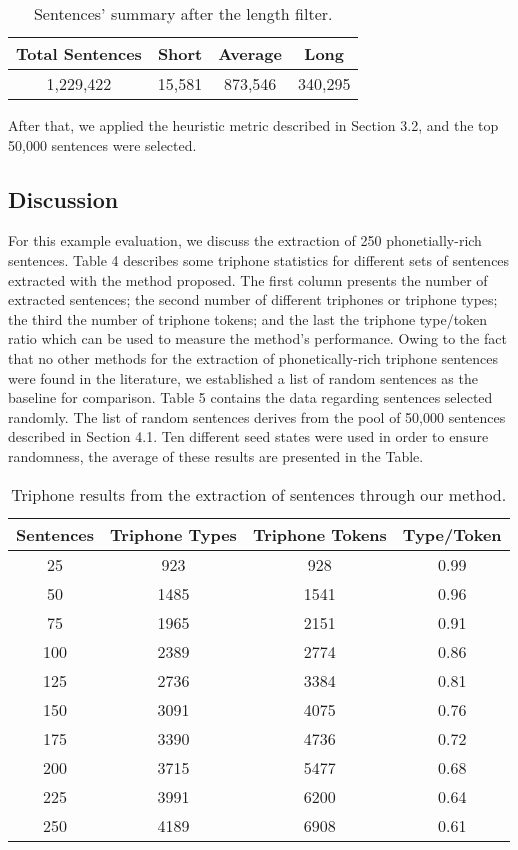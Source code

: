 \begin{table}[!ht]
\begin{center}
\begin{tabular}{|c|c|c|c|}
\hline
\textbf{Total Sentences} & \textbf{Short} & \textbf{Average} & \textbf{Long} \\ \hline
1,229,422 & 15,581 & 873,546 & 340,295 \\ \hline
\end{tabular}
\end{center}
\caption{\label{filtered-sent} Sentences' summary after the length filter.}
\end{table}

After that, we applied the heuristic metric described in Section 3.2, and the top 50,000 sentences were selected.

\subsection{Discussion}

For this example evaluation, we discuss the extraction of 250 phonetially-rich sentences. Table 4 describes some triphone statistics for different sets of sentences extracted with the method proposed. The first column presents the number of extracted sentences; the second number of different triphones or triphone types; the third the number of triphone tokens; and the last the triphone type/token ratio which can be used to measure the method's performance. 
Owing to the fact that no other methods for the extraction of phonetically-rich triphone sentences were found in the literature,
we established a list of random sentences as the baseline for comparison. Table 5 contains the data regarding sentences selected randomly. The list of random sentences derives from the pool of 
50,000 sentences described in Section 4.1. Ten different seed states were used in order to ensure
randomness, the average of these results are presented in the Table. 

\begin{table}[!ht]
\begin{center}
\begin{tabular}{|c|c|c|c|}
\hline
Sentences & Triphone Types & Triphone Tokens & Type/Token \\ \hline
25 & 923 & 928 & 0.99 \\
50 & 1485 & 1541 & 0.96 \\
75 & 1965 & 2151 & 0.91 \\
100 & 2389 & 2774 & 0.86 \\
125 & 2736 & 3384 & 0.81 \\
150 & 3091 & 4075 & 0.76 \\
175 & 3390 & 4736 & 0.72 \\
200 & 3715 & 5477 & 0.68 \\
225 & 3991 & 6200 & 0.64 \\
250 & 4189 & 6908 & 0.61 \\ \hline
\end{tabular}
\end{center}
\caption{\label{results-tri-extracted} Triphone results from the extraction of sentences through our method.}
\end{table}

